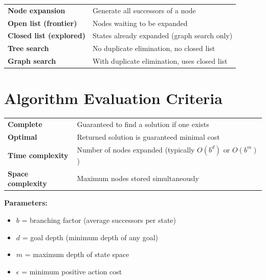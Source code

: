 \documentclass[11pt,a4paper]{article}
\begin{document}
\begin{definitionbox}
\begin{tabular}{@{}ll@{}}
\textbf{Node expansion} & Generate all successors of a node \\
\textbf{Open list (frontier)} & Nodes waiting to be expanded \\
\textbf{Closed list (explored)} & States already expanded (graph search only) \\
\textbf{Tree search} & No duplicate elimination, no closed list \\
\textbf{Graph search} & With duplicate elimination, uses closed list \\
\end{tabular}
\end{definitionbox}

\section{Algorithm Evaluation Criteria}

\begin{definitionbox}
\begin{tabular}{@{}lp{10cm}@{}}
\textbf{Complete} & Guaranteed to find a solution if one exists \\
\textbf{Optimal} & Returned solution is guaranteed minimal cost \\
\textbf{Time complexity} & Number of nodes expanded (typically $O(b^d)$ or $O(b^m)$) \\
\textbf{Space complexity} & Maximum nodes stored simultaneously \\
\end{tabular}

\textbf{Parameters:}
\begin{itemize}[leftmargin=*,nosep]
\item $b$ = branching factor (average successors per state)
\item $d$ = goal depth (minimum depth of any goal)
\item $m$ = maximum depth of state space
\item $\epsilon$ = minimum positive action cost
\end{itemize}
\end{definitionbox}

\end{document}
